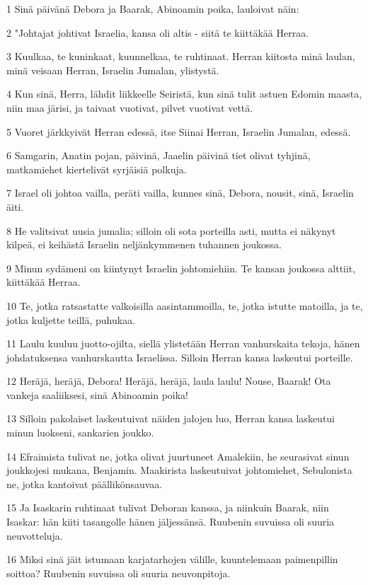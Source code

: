 \par 1 Sinä päivänä Debora ja Baarak, Abinoamin poika, lauloivat näin:
\par 2 "Johtajat johtivat Israelia, kansa oli altis - siitä te kiittäkää Herraa.
\par 3 Kuulkaa, te kuninkaat, kuunnelkaa, te ruhtinaat. Herran kiitosta minä laulan, minä veisaan Herran, Israelin Jumalan, ylistystä.
\par 4 Kun sinä, Herra, lähdit liikkeelle Seiristä, kun sinä tulit astuen Edomin maasta, niin maa järisi, ja taivaat vuotivat, pilvet vuotivat vettä.
\par 5 Vuoret järkkyivät Herran edessä, itse Siinai Herran, Israelin Jumalan, edessä.
\par 6 Samgarin, Anatin pojan, päivinä, Jaaelin päivinä tiet olivat tyhjinä, matkamiehet kiertelivät syrjäisiä polkuja.
\par 7 Israel oli johtoa vailla, peräti vailla, kunnes sinä, Debora, nousit, sinä, Israelin äiti.
\par 8 He valitsivat uusia jumalia; silloin oli sota porteilla asti, mutta ei näkynyt kilpeä, ei keihästä Israelin neljänkymmenen tuhannen joukossa.
\par 9 Minun sydämeni on kiintynyt Israelin johtomiehiin. Te kansan joukossa alttiit, kiittäkää Herraa.
\par 10 Te, jotka ratsastatte valkoisilla aasintammoilla, te, jotka istutte matoilla, ja te, jotka kuljette teillä, puhukaa.
\par 11 Laulu kuuluu juotto-ojilta, siellä ylistetään Herran vanhurskaita tekoja, hänen johdatuksensa vanhurskautta Israelissa. Silloin Herran kansa laskeutui porteille.
\par 12 Heräjä, heräjä, Debora! Heräjä, heräjä, laula laulu! Nouse, Baarak! Ota vankeja saaliiksesi, sinä Abinoamin poika!
\par 13 Silloin pakolaiset laskeutuivat näiden jalojen luo, Herran kansa laskeutui minun luokseni, sankarien joukko.
\par 14 Efraimista tulivat ne, jotka olivat juurtuneet Amalekiin, he seurasivat sinun joukkojesi mukana, Benjamin. Maakirista laskeutuivat johtomiehet, Sebulonista ne, jotka kantoivat päällikönsauvaa.
\par 15 Ja Isaskarin ruhtinaat tulivat Deboran kanssa, ja niinkuin Baarak, niin Isaskar: hän kiiti tasangolle hänen jäljessänsä. Ruubenin suvuissa oli suuria neuvotteluja.
\par 16 Miksi sinä jäit istumaan karjatarhojen välille, kuuntelemaan paimenpillin soittoa? Ruubenin suvuissa oli suuria neuvonpitoja.
